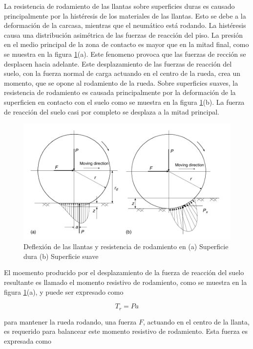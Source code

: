 \documentclass[12pt]{book}
\theoremstyle{definition}
\theoremstyle{remark}
\theoremstyle{plain}
\begin{document}
La resistencia de rodamiento de las llantas sobre superficies duras es causado principalmente
por la histéresis de los materiales de las llantas. Esto se debe a la deformación de la carcasa, mientras que
el neumático está rodando. La histéresis causa una distribución asimétrica de las fuerzas de 
reacción del piso. La presión en el medio principal de la zona de contacto es
mayor que en la mitad final, como se muestra en la figura \ref{fig101}(a). Este fenomeno provoca
que las fuerzas de rección se desplacen hacia adelante. Este desplazamiento de las fuerzas de 
reacción del suelo, con la fuerza normal de carga actuando en el centro de la rueda, crea un 
momento, que se opone al rodamiento de la rueda. Sobre superficies suaves, la resistencia de 
rodamiento es causada principalmente por la deformación de la superficien en contacto con el suelo
como se muestra en la figura \ref{fig101}(b). La fuerza de reacción del suelo casi por completo
se desplaza a la mitad principal.
\begin{figure}
\centering
\includegraphics[width=5in]{Llantas.png}
\caption{Deflexión de las llantas y resistencia de rodamiento en (a) Superficie dura (b) Superficie suave \cite{MehrdadEhsani2005}}
\label{fig101}
\end{figure}

El moemento producido por el desplazamiento de la fuerza de reacción del suelo resultante es 
llamado el momento resistivo de rodamiento, como se muestra en la figura \ref{fig101}(a), y puede 
ser expresado como

\begin{equation}
 \label{equ101}
T_r=P a
\end{equation} 

para mantener la rueda rodando, una fuerza $F$, actuando en el centro de la llanta, es requerido
para balancear este momento resistivo de rodamiento. Esta fuerza es expresada como
\end{document}
